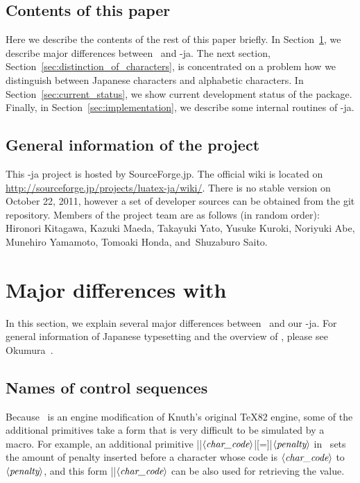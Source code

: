 \documentclass{ajt}
\begin{document}
\subsection{Contents of this paper}
Here we describe the contents of the rest of this paper briefly.  In
Section~\ref{sec:differences_with_ptex}, we describe major differences
between \pTeX\ and \LuaTeX-ja.  The next section,
Section~\ref{sec:distinction_of_characters}, is concentrated on a
problem how we distinguish between Japanese characters and alphabetic
characters. In Section~\ref{sec:current_status}, we show current
development status of the package.  Finally, in
Section~\ref{sec:implementation}, we describe some internal routines of
\LuaTeX-ja.

\subsection{General information of the project}
This \LuaTeX-ja project is hosted by SourceForge.jp. The official wiki
is located on
\url{http://sourceforge.jp/projects/luatex-ja/wiki/}.  There is
no stable version on October 22, 2011, however a set of developer sources can be
obtained from the git repository.  Members of the project team are as follows
(in random order): Hironori Kitagawa, Kazuki Maeda, Takayuki Yato,
Yusuke Kuroki, Noriyuki Abe, Munehiro Yamamoto, Tomoaki Honda,
and~Shuzaburo Saito.


\section{Major differences with \pTeX}
\label{sec:differences_with_ptex}
In this section, we explain several major differences between \pTeX\
and our \LuaTeX-ja.  For general information of Japanese typesetting and the
overview of \pTeX, please see Okumura~\cite{ptexjp}.


\subsection{Names of control sequences}
\label{ssec-csname} Because \pTeX\ is an engine modification of Knuth's
original \TeX82 engine, some of the additional primitives take a form that is
very difficult to be simulated by a macro.  For example, an additional
primitive |\prebreakpenalty|$\langle\hbox{\it
char\_code}\rangle$|[=]|$\langle\hbox{\it penalty}\rangle$ in \pTeX\
sets the amount of penalty inserted before a character whose code is
$\langle\hbox{\it char\_code}\rangle$ to $\langle\hbox{\it
penalty}\rangle$, and this form |\prebreakpenalty|$\langle\hbox{\it
char\_code}\rangle$ can be also used for retrieving the value.
\end{document}

